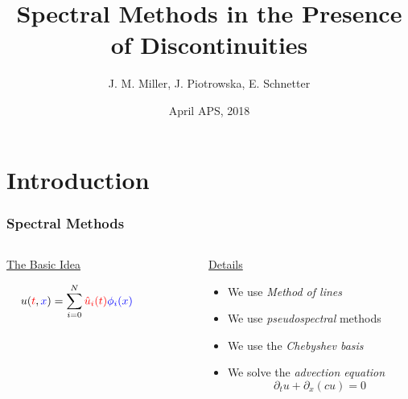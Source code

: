 \documentclass[9pt,usepdftitle=false,aspectratio=169]{beamer}
\title[Spectral Discontinuities]{Spectral Methods in the Presence of Discontinuities}
\author[Co-Design Summer School]{
  J. M. Miller,
  {\texorpdfstring{\color{blue}}{}J. Piotrowska},
  E. Schnetter}
\institute[LANL]{\color{blue}Los Alamos National Laboratory}
\date[April APS]{\color{black}April APS, 2018}
\begin{document}
\section{Introduction}
\begin{frame}[plain]
  \titlepage
\end{frame}

\begin{frame}
  \frametitle{Spectral Methods}
  \begin{columns}
    \begin{column}{0.5\textwidth}
      \begin{center}
        \underline{\huge\color{blue}The Basic Idea}\\
        \vspace{0.75cm}
        \begin{huge}
          $$u({\color{red}t},{\color{blue}x}) = \sum_{i=0}^N{\color{red}\hat{u}_i(t)}{\color{blue}\phi_i(x)}$$
        \end{huge}
        \vspace{2cm}
      \end{center}
    \end{column}
    \vrule{}
    \begin{column}{0.05\textwidth}\end{column}
    \begin{column}{0.45\textwidth}
      \begin{center}
        \underline{\huge\color{red}Details}
      \end{center}
      \vspace{1.2cm}
      \begin{itemize}
      \item We use \textit{Method of lines}
      \item We use \textit{pseudospectral} methods
      \item We use the \textit{Chebyshev basis}
      \item We solve the \textit{advection equation}
        { \huge
          $$\partial_t u + \partial_x (c u) = 0 $$
        }
      \end{itemize}
      \vspace{1cm}
    \end{column}
  \end{columns}
\end{frame}
\end{document}
